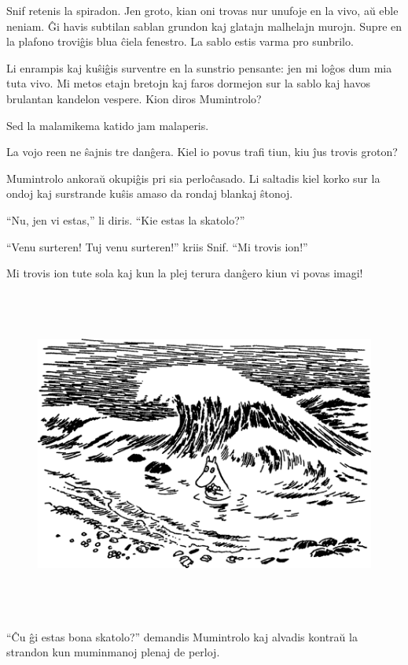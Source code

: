 Snif retenis la spiradon. Jen groto, kian oni trovas nur unufoje en la vivo, aŭ eble neniam. Ĝi havis subtilan sablan grundon kaj glatajn malhelajn murojn. Supre en la plafono troviĝis blua ĉiela fenestro. La sablo estis varma pro sunbrilo.

Li enrampis kaj kuŝiĝis surventre en la sunstrio pensante: jen mi loĝos dum mia tuta vivo. Mi metos etajn bretojn kaj faros dormejon sur la sablo kaj havos brulantan kandelon vespere. Kion diros Mumintrolo?

Sed la malamikema katido jam malaperis.

\sectionbreak

La vojo reen ne ŝajnis tre danĝera. Kiel io povus trafi tiun, kiu ĵus trovis groton?

Mumintrolo ankoraŭ okupiĝis pri sia perloĉasado. Li saltadis kiel korko sur la ondoj kaj surstrande kuŝis amaso da rondaj blankaj ŝtonoj.

``Nu, jen vi estas,'' li diris. ``Kie estas la skatolo?''

``Venu surteren! Tuj venu surteren!'' kriis Snif. ``Mi trovis ion!''

Mi trovis ion tute sola kaj kun la plej terura danĝero kiun vi povas imagi!

\begin{figure}[htbp]
\centering
\includegraphics[width=450pt,height=307pt]{1-8.png}
\caption{}
\label{1-8}
\end{figure}

``Ĉu ĝi estas bona skatolo?'' demandis Mumintrolo kaj alvadis kontraŭ la strandon kun muminmanoj plenaj de perloj.

